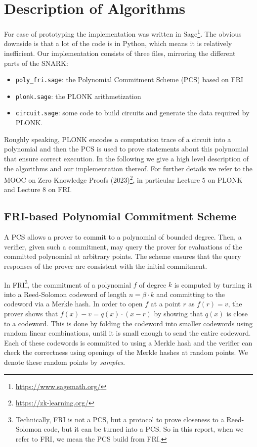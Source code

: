 \documentclass{zamarep}
\begin{document}
\section{Description of Algorithms}
\label{sec:desc}

For ease of prototyping the implementation was written in Sage\footnote{\url{https://www.sagemath.org/}}. The obvious downside is that a lot of the code is in Python, which means it is relatively inefficient. Our implementation consists of three files, mirroring the different parts of the SNARK:
\begin{itemize}
\item \texttt{poly\_fri.sage}: the Polynomial Commitment Scheme (PCS) based on FRI
\item \texttt{plonk.sage}: the PLONK arithmetization
\item \texttt{circuit.sage}: some code to build circuits and generate the data required by PLONK.
\end{itemize}

Roughly speaking, PLONK encodes a computation trace of a circuit into a polynomial and then the PCS is used to prove statements about this polynomial that ensure correct execution. In the following we give a high level description of the algorithms and our implementation thereof. For further details we refer to the MOOC on Zero Knowledge Proofs (2023)\footnote{\url{https://zk-learning.org/}}, in particular Lecture 5 on PLONK and Lecture 8 on FRI.


\subsection{FRI-based Polynomial Commitment Scheme}
\label{sec:fri}

A PCS allows a prover to commit to a polynomial of bounded degree. Then, a verifier, given such a commitment, may query the prover for evaluations of the committed polynomial at arbitrary points. The scheme ensures that the query responses of the prover are consistent with the initial commitment.

In FRI\footnote{Technically, FRI is not a PCS, but a protocol to prove closeness to a Reed-Solomon code, but it can be turned into a PCS. So in this report, when we refer to FRI, we mean the PCS build from FRI.}, the commitment of a polynomial $f$ of degree $k$ is computed by turning it into a Reed-Solomon codeword of length $n = \beta \cdot k$ and committing to the codeword via a Merkle hash. In order to open $f$ at a point $r$ as $f(r) = v$, the prover shows that $f(x) - v = q(x) \cdot (x - r)$ by showing that $q(x)$ is close to a codeword. This is done by folding the codeword into smaller codewords using random linear combinations, until it is small enough to send the entire codeword. Each of these codewords is committed to using a Merkle hash and the verifier can check the correctness using openings of the Merkle hashes at random points. We denote these random points by \emph{samples}.
\end{document}
